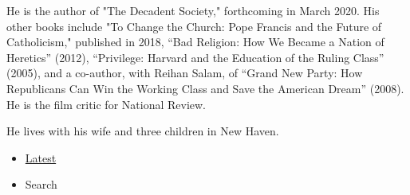 He is the author of "The Decadent Society," forthcoming in March 2020.
His other books include "To Change the Church: Pope Francis and the
Future of Catholicism," published in 2018, ``Bad Religion: How We Became
a Nation of Heretics'' (2012), ``Privilege: Harvard and the Education of
the Ruling Class'' (2005), and a co-author, with Reihan Salam, of
``Grand New Party: How Republicans Can Win the Working Class and Save
the American Dream'' (2008). He is the film critic for National Review.

He lives with his wife and three children in New Haven.

\begin{itemize}
\tightlist
\item
  \protect\hyperlink{stream-panel}{Latest}
\item
  Search
\end{itemize}

